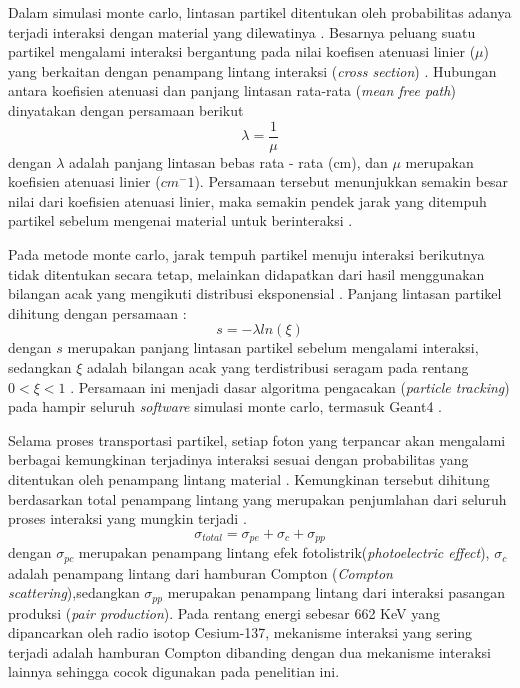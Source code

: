 \documentclass[12pt,a4paper]{report}
\begin{document}
Dalam simulasi monte carlo, lintasan partikel ditentukan oleh probabilitas adanya terjadi interaksi dengan material yang dilewatinya \cite{agma2025simulasi}. Besarnya peluang suatu partikel mengalami interaksi bergantung pada nilai koefisen atenuasi linier ($\mu$) yang berkaitan dengan penampang lintang interaksi (\textit{cross section}) \cite{agma2025simulasi}. Hubungan antara koefisien atenuasi dan panjang lintasan rata-rata (\textit{mean free path}) dinyatakan dengan persamaan berikut
\begin{equation}
    \lambda = \frac{1}{\mu}
\end{equation}
dengan $\lambda$ adalah panjang lintasan bebas rata - rata (cm), dan $\mu$ merupakan koefisien atenuasi linier ($cm^-1$). Persamaan tersebut menunjukkan semakin besar nilai dari koefisien atenuasi linier, maka semakin pendek jarak yang ditempuh partikel sebelum mengenai material untuk berinteraksi \cite{agma2025simulasi}.

Pada metode monte carlo, jarak tempuh partikel menuju interaksi berikutnya tidak ditentukan secara tetap, melainkan didapatkan dari hasil menggunakan bilangan acak yang mengikuti distribusi eksponensial \cite{yusmaity2019simulasi}. Panjang lintasan partikel dihitung dengan persamaan :
\begin{equation}
    s = -\lambda ln (\xi)
\end{equation}
dengan $s$ merupakan panjang lintasan partikel sebelum mengalami interaksi, sedangkan $\xi$ adalah bilangan acak yang terdistribusi seragam pada rentang $ 0 < \xi < 1$ \cite{agma2025simulasi}. Persamaan ini menjadi dasar algoritma pengacakan (\textit{particle tracking}) pada hampir seluruh \textit{software} simulasi monte carlo, termasuk Geant4 \cite{agostinelli2003geant4}.

Selama proses transportasi partikel, setiap foton yang terpancar akan mengalami berbagai kemungkinan terjadinya interaksi sesuai dengan probabilitas yang ditentukan oleh penampang lintang material \cite{agma2025simulasi}. Kemungkinan tersebut dihitung berdasarkan total penampang lintang yang merupakan penjumlahan dari seluruh proses interaksi yang mungkin terjadi \cite{agma2025simulasi}.
\begin{equation}
    \sigma_{total} = \sigma_{pe} + \sigma_{c} + \sigma_{pp}
\end{equation}
dengan $\sigma_{pc}$ merupakan penampang lintang efek fotolistrik(\textit{photoelectric effect}), $\sigma_c$ adalah penampang lintang dari hamburan Compton (\textit{Compton scattering}),sedangkan $\sigma_{pp}$ merupakan penampang lintang dari interaksi pasangan produksi (\textit{pair production}). Pada rentang energi sebesar 662 KeV yang dipancarkan 
oleh radio isotop Cesium-137, mekanisme interaksi yang sering terjadi adalah hamburan Compton dibanding dengan dua mekanisme interaksi lainnya sehingga cocok digunakan pada penelitian ini.
\end{document}
